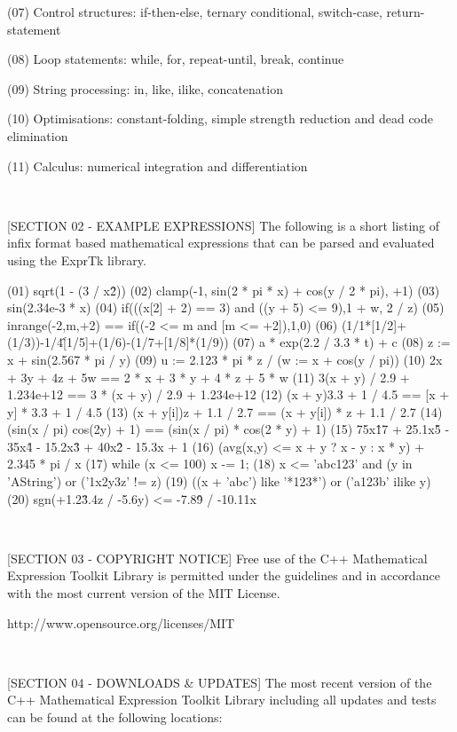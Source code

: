 (07) Control
structures:      if-then-else, ternary conditional, switch-case,
return-statement

(08) Loop statements: while, for, repeat-until, break, continue

(09) String
processing:      in, like, ilike, concatenation

(10) Optimisations:   constant-folding, simple strength reduction and
dead code elimination

(11) Calculus:        numerical integration and differentiation

~~~~~~~~~~~~~~~~~~~~~~~~~~~~~~~~~~~~~~~~~~~~~~~~~~~~~~~~~~

[SECTION 02 - EXAMPLE EXPRESSIONS]
The following is  a short listing  of infix format  based mathematical
expressions that can be parsed and evaluated using the ExprTk library.

(01) sqrt(1 - (3 / x\^2))
(02) clamp(-1, sin(2 * pi * x) + cos(y / 2 * pi), +1)
(03) sin(2.34e-3 * x)
(04) if(((x[2] + 2) == 3) and ((y + 5) <= 9),1 + w, 2 / z)
(05) inrange(-2,m,+2) == if(({-2 <= m} and [m <= +2]),1,0)
(06) ({1/1}*[1/2]+(1/3))-{1/4}\^[1/5]+(1/6)-({1/7}+[1/8]*(1/9))
(07) a * exp(2.2 / 3.3 * t) + c
(08) z := x + sin(2.567 * pi / y)
(09) u := 2.123 * {pi * z} / (w := x + cos(y / pi))
(10) 2x + 3y + 4z + 5w == 2 * x + 3 * y + 4 * z + 5 * w
(11) 3(x + y) / 2.9 + 1.234e+12 == 3 * (x + y) / 2.9 + 1.234e+12
(12) (x + y)3.3 + 1 / 4.5 == [x + y] * 3.3 + 1 / 4.5
(13) (x + y[i])z + 1.1 / 2.7 == (x + y[i]) * z + 1.1 / 2.7
(14) (sin(x / pi) cos(2y) + 1) == (sin(x / pi) * cos(2 * y) + 1)
(15) 75x\^17 + 25.1x\^5 - 35x\^4 - 15.2x\^3 + 40x\^2 - 15.3x + 1
(16) (avg(x,y) <= x + y ? x - y : x * y) + 2.345 * pi / x
(17) while (x <= 100) { x -= 1; }
(18) x <= 'abc123' and (y in 'AString') or ('1x2y3z' != z)
(19) ((x + 'abc') like '*123*') or ('a123b' ilike y)
(20) sgn(+1.2\^3.4z / -5.6y) <= {-7.8\^9 / -10.11x }

~~~~~~~~~~~~~~~~~~~~~~~~~~~~~~~~~~~~~~~~~~~~~~~~~~~~~~~~~~

[SECTION 03 - COPYRIGHT NOTICE]
Free  use  of  the  C++  Mathematical  Expression  Toolkit  Library is
permitted under the guidelines and in accordance with the most current
version of the MIT License.

http://www.opensource.org/licenses/MIT

~~~~~~~~~~~~~~~~~~~~~~~~~~~~~~~~~~~~~~~~~~~~~~~~~~~~~~~~~~

[SECTION 04 - DOWNLOADS \& UPDATES]
The most  recent version  of the C++ Mathematical  Expression  Toolkit
Library including all updates and tests can be found at the  following
locations:

